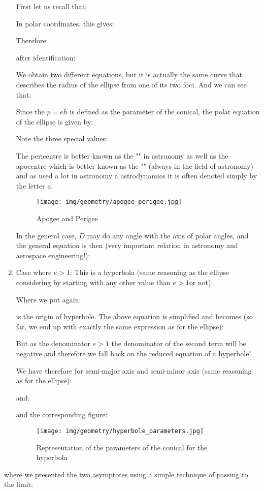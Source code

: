 \begin{enumerate}
		First let us recall that:
		
		In polar coordinates, this gives:
		
		Therefore:
		
		after identification:
		
		We obtain two different equations, but it is actually the same curve that describes the radius of the ellipse from one of its two foci. And we can see that:
		
		Since the $p=eh$ is defined as the parameter of the conical, the polar equation of the ellipse is given by:
		
		Note the three special values:
		
		The pericentre is better known as the "" in astronomy as well as the apocentre which is better known as the "" (always in the field of astronomy) and as used a lot in astronomy a astrodynamics it is often denoted simply by the letter $a$.
		\begin{figure}[H]
			\centering
			\texttt{[image: img/geometry/apogee\_perigee.jpg]}
			\caption{Apogee and Perigee}
		\end{figure}
		In the general case, $D$ may do any angle with the axis of polar angles, and the general equation is then (very important relation in astronomy and aerospace engineering!):
		
		
		\item Case where $e>1$:
		This is a hyperbola (same reasoning as the ellipse considering by starting with any other value than $e>1 $or not):
		
		Where we put again:
		
		is the origin of hyperbole. The above equation is simplified and becomes (so far, we end up with exactly the same expression as for the ellipse):
		
		But as the denominator $e>1$ the denominator of the second term will be negative and therefore we fall back on the reduced equation of a hyperbole!
		
		We have therefore for semi-major axis and semi-minor axis (same reasoning as for the ellipse):
		
		and:
		
		and the corresponding figure:
		\begin{figure}[H]
			\centering
			\texttt{[image: img/geometry/hyperbole\_parameters.jpg]}
			\caption{Representation of the parameters of the conical for the hyperbola}
		\end{figure}
	\end{enumerate}
	where we presented the two asymptotes using a simple technique of passing to the limit:
	
